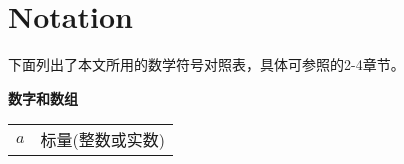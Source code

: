 \chapter*{Notation}
\label{notation}



下面列出了本文所用的数学符号对照表，具体可参照\citet{dlbook}的2-4章节。

\vspace{\notationgap}
\begin{minipage}{\textwidth}
\centerline{\bf 数字和数组}
\bgroup
\def\arraystretch{1.5}
\begin{tabular}{cp{3.25in}}
$\displaystyle a$ & 标量(整数或实数)\\

\end{tabular}
\end{minipage}
